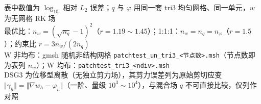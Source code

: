 \begin{table}[htbp]
\par\vspace{3pt}
{\footnotesize\raggedright
表中数值为 $\log_{10}$ 相对 $L_2$ 误差；$q$ 与 $\varphi$ 用同一套 tri3 均匀网格、同一单元，$w$ 为无网格 RK 场\\
最优比：$n_w=(\sqrt{n_q}-1)^2$（$r=1.19\sim1.45$）；1:1:1：$n_w=n_q=n_\varphi$（$r=1.5$）；约束比 $r=3n_w/(2n_q)$\\
W 非均布：gmsh 随机非结构网格 \texttt{patchtest\_un\_tri3\_<节点数>.msh}（节点数即为表列 $n_w$）；W 均布：\texttt{patchtest\_tri3\_<ndiv>.msh}\\
DSG3 为位移型离散（无独立剪力场），其剪力误差列为原始剪切应变 $\Vert\gamma_h\Vert=\Vert\nabla w_h-\varphi_h\Vert$（一阶、量级 $10^3\sim10^4$），与混合场 $q$ 不可直接比较，仅列作对照
\par}
\end{table}
